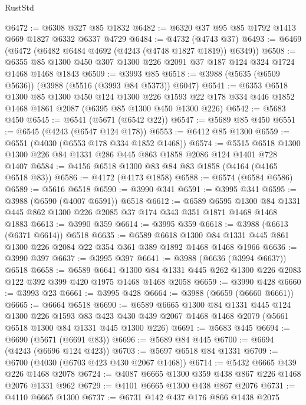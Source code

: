 \begin{lexlean}{RustStd}
\begin{coremodule}
@6472 := @6308 @327 @85 @1832
@6482 := @6320 @37 @95 @85 @1792 @1413 @669 @1827 @6332 @6337 @4729
@6484 := @4732 (@4743 @37)
@6493 := @6469 (@6472 (@6482 @6484 @4692 (@4243 (@4748 @1827 @1819)) @6349))
@6508 := @6355 @85 @1300 @450 @307 @1300 @226 @2091 @37 @187 @124 @324 @1724 @1468 @1468 @1843
@6509 := @3993 @85
@6518 := @3988 (@5635 (@6509 @5636)) (@3988 (@5516 (@3993 @84 @5373)) @6047)
@6541 := @6353
    @6518
    @1300
    @85
    @1300
    @450
    @124
    @1300
    @226
    @1593
    @22
    @178
    @334
    @446
    @1852
    @1468
    @1861
    @2087
    (@6395 @85 @1300 @450 @1300 @226)
@6542 := @5683 @450
@6545 := @6541 (@5671 (@6542 @22))
@6547 := @5689 @85 @450
@6551 := @6545 (@4243 (@6547 @124 @178))
@6553 := @6412 @85 @1300
@6559 := @6551 (@4030 (@6553 @178 @334 @1852 @1468))
@6574 := @5515 @6518 @1300 @1300 @226 @84 @1331 @286 @445 @863 @1858 @2086 @124 @1401 @728 @1407
@6584 := @4156 @6518 @1300 @83 @84 @83 @1858 (@4164 (@4165 @6518 @83))
@6586 := @4172 (@4173 @1858)
@6588 := @6574 (@6584 @6586)
@6589 := @5616 @6518
@6590 := @3990 @341
@6591 := @3995 @341
@6595 := @3988 (@6590 (@4007 @6591)) @6518
@6612 := @6589
    @6595
    @1300
    @84
    @1331
    @445
    @862
    @1300
    @226
    @2085
    @37
    @174
    @343
    @351
    @1871
    @1468
    @1468
    @1883
@6613 := @3990 @359
@6614 := @3995 @359
@6618 := @3988 (@6613 (@6371 @6614)) @6518
@6635 := @6589
    @6618
    @1300
    @84
    @1331
    @445
    @861
    @1300
    @226
    @2084
    @22
    @354
    @361
    @389
    @1892
    @1468
    @1468
    @1966
@6636 := @3990 @397
@6637 := @3995 @397
@6641 := @3988 (@6636 (@3994 @6637)) @6518
@6658 := @6589
    @6641
    @1300
    @84
    @1331
    @445
    @262
    @1300
    @226
    @2083
    @122
    @392
    @399
    @420
    @1975
    @1468
    @1468
    @2058
@6659 := @3990 @428
@6660 := @3993 @23
@6661 := @3995 @428
@6664 := @3988 (@6659 (@6660 @6661))
@6665 := @6664 @6518
@6690 := @6589
    @6665
    @1300
    @84
    @1331
    @445
    @124
    @1300
    @226
    @1593
    @83
    @423
    @430
    @439
    @2067
    @1468
    @1468
    @2079
    (@5661 @6518 @1300 @84 @1331 @445 @1300 @226)
@6691 := @5683 @445
@6694 := @6690 (@5671 (@6691 @83))
@6696 := @5689 @84 @445
@6700 := @6694 (@4243 (@6696 @124 @423))
@6703 := @5697 @6518 @84 @1331
@6709 := @6700 (@4030 (@6703 @423 @430 @2067 @1468))
@6714 := @5432 @6665 @439 @226 @1468 @2078
@6724 := @4087 @6665 @1300 @359 @438 @867 @226 @1468 @2076 @1331 @962
@6729 := @4101 @6665 @1300 @438 @867 @2076
@6731 := @4110 @6665 @1300
@6737 := @6731 @142 @437 @176 @866 @1438 @2075

\end{coremodule}
\end{lexlean}
